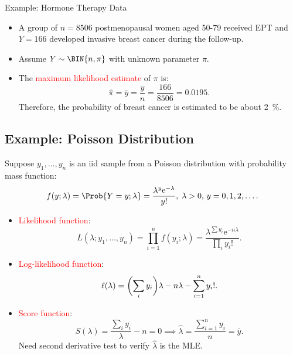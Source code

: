 \documentclass{article}\usepackage[]{graphicx}\usepackage[svgnames]{xcolor}
\let\log\relax%
\begin{document}
\begin{Example}{Example: Hormone Therapy Data}
      \begin{itemize}
            \item A group of $ n=8506 $ postmenopausal women aged 50-79 received EPT and $ Y=166 $
                  developed invasive breast cancer during the follow-up.
            \item Assume $ Y \sim \BIN{n,\pi} $ with unknown parameter $ \pi $.
            \item The \textcolor{Red}{maximum likelihood estimate} of $ \pi $ is:
                  \[ \hat{\pi}=\bar{y}=\frac{y}{n} =\frac{166}{8506}=0.0195. \]
                  Therefore, the probability of breast cancer is estimated to be about \qty{2}{\percent}.
      \end{itemize}
\end{Example}
\subsection*{Example: Poisson Distribution}
Suppose $ y_1,\ldots,y_n $ is an iid sample from a Poisson distribution with probability mass function:
\[ f(y;\lambda)=\Prob{Y=y;\lambda}=\frac{\lambda^y \mathrm{e}^{-\lambda}}{y!},\; \lambda>0,\,y=0,1,2,\ldots.  \]
\begin{itemize}
      \item \textcolor{Red}{Likelihood function}:
            \[ L(\lambda;y_1,\ldots,y_n)=\prod_{i=1}^n f(y_i;\lambda)=\frac{\lambda^{\sum y_i}\mathrm{e}^{-n\lambda}}{\prod_i y_i!}.  \]
      \item \textcolor{Red}{Log-likelihood function}:
            \[ \ell(\lambda)=\biggl(\sum_i y_i\biggr)\log{\lambda}-n\lambda-\sum_{i=1}^{n} \log{y_i!}. \]
      \item \textcolor{Red}{Score function}:
            \[ S(\lambda)=\frac{\sum_i y_i}{\lambda}-n=0\implies \hat{\lambda}=\frac{\sum_{i=1}^{n} y_i}{n} =\bar{y}.  \]
            Need second derivative test to verify $ \hat{\lambda} $ is the MLE\@.
\end{itemize}
\end{document}
